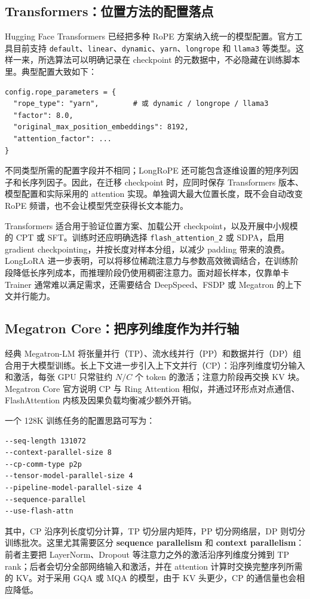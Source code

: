 \documentclass[UTF8,10pt,a4paper,fontset=none]{ctexart}
\newcommand{\key}[1]{\textbf{\color{navy}#1}}
\begin{document}
\subsection{Transformers：位置方法的配置落点}
Hugging Face Transformers 已经把多种 RoPE 方案纳入统一的模型配置。官方工具目前支持 \texttt{default}、\texttt{linear}、\texttt{dynamic}、\texttt{yarn}、\texttt{longrope} 和 \texttt{llama3} 等类型\cite{hfrope}。这样一来，所选算法可以明确记录在 checkpoint 的元数据中，不必隐藏在训练脚本里。典型配置大致如下：
\begin{verbatim}
config.rope_parameters = {
  "rope_type": "yarn",        # 或 dynamic / longrope / llama3
  "factor": 8.0,
  "original_max_position_embeddings": 8192,
  "attention_factor": ...
}
\end{verbatim}
不同类型所需的配置字段并不相同；LongRoPE 还可能包含逐维设置的短序列因子和长序列因子。因此，在迁移 checkpoint 时，应同时保存 Transformers 版本、模型配置和实际采用的 attention 实现。单独调大最大位置长度，既不会自动改变 RoPE 频谱，也不会让模型凭空获得长文本能力。

Transformers 适合用于验证位置方案、加载公开 checkpoint，以及开展中小规模的 CPT 或 SFT。训练时还应明确选择 \texttt{flash\_attention\_2} 或 SDPA，启用 gradient checkpointing，并按长度对样本分组，以减少 padding 带来的浪费。LongLoRA 进一步表明，可以将移位稀疏注意力与参数高效微调结合，在训练阶段降低长序列成本，而推理阶段仍使用稠密注意力\cite{chen2023longlora}。面对超长样本，仅靠单卡 Trainer 通常难以满足需求，还需要结合 DeepSpeed、FSDP 或 Megatron 的上下文并行能力。

\subsection{Megatron Core：把序列维度作为并行轴}
经典 Megatron-LM 将张量并行（TP）、流水线并行（PP）和数据并行（DP）组合用于大模型训练\cite{narayanan2021megatron}。长上下文进一步引入上下文并行（CP）：沿序列维度切分输入和激活，每张 GPU 只常驻约 $N/C$ 个 token 的激活；注意力阶段再交换 KV 块。Megatron Core 官方说明 CP 与 Ring Attention 相似，并通过环形点对点通信、FlashAttention 内核及因果负载均衡减少额外开销\cite{megatroncp}。

一个 128K 训练任务的配置思路可写为：
\begin{verbatim}
--seq-length 131072
--context-parallel-size 8
--cp-comm-type p2p
--tensor-model-parallel-size 4
--pipeline-model-parallel-size 4
--sequence-parallel
--use-flash-attn
\end{verbatim}
其中，CP 沿序列长度切分计算，TP 切分层内矩阵，PP 切分网络层，DP 则切分训练批次。这里尤其需要区分 \key{sequence parallelism} 和 \key{context parallelism}：前者主要把 LayerNorm、Dropout 等注意力之外的激活沿序列维度分摊到 TP rank；后者会切分全部网络输入和激活，并在 attention 计算时交换完整序列所需的 KV\cite{megatroncp}。对于采用 GQA 或 MQA 的模型，由于 KV 头更少，CP 的通信量也会相应降低\cite{ainslie2023gqa}。
\end{document}
